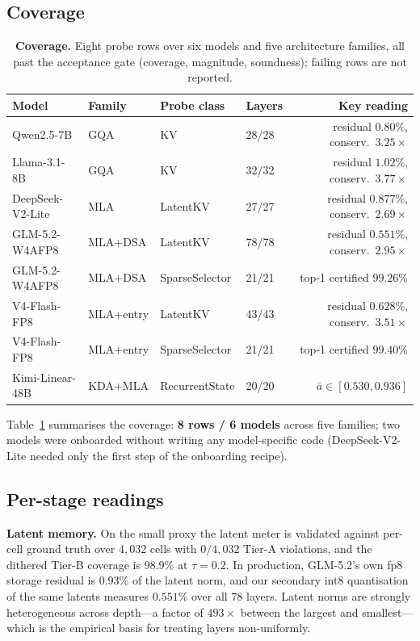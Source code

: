 \documentclass[11pt]{article}
\begin{document}
\subsection{Coverage}
\begin{table}[t]\centering\small
\begin{tabular}{llllr}
\toprule
Model & Family & Probe class & Layers & Key reading\\
\midrule
Qwen2.5-7B      & GQA & KV & 28/28 & residual $0.80\%$, conserv.\ $3.25\times$\\
Llama-3.1-8B    & GQA & KV & 32/32 & residual $1.02\%$, conserv.\ $3.77\times$\\
DeepSeek-V2-Lite& MLA & LatentKV & 27/27 & residual $0.877\%$, conserv.\ $2.69\times$\\
GLM-5.2-W4AFP8  & MLA+DSA & LatentKV & 78/78 & residual $0.551\%$, conserv.\ $2.95\times$\\
GLM-5.2-W4AFP8  & MLA+DSA & SparseSelector & 21/21 & top-1 certified $99.26\%$\\
V4-Flash-FP8    & MLA+entry & LatentKV & 43/43 & residual $0.628\%$, conserv.\ $3.51\times$\\
V4-Flash-FP8    & MLA+entry & SparseSelector & 21/21 & top-1 certified $99.40\%$\\
Kimi-Linear-48B & KDA+MLA & RecurrentState & 20/20 & $\bar a\in[0.530,0.936]$\\
\bottomrule
\end{tabular}
\caption{\textbf{Coverage.} Eight probe rows over six models and
five architecture families, all past the acceptance gate (coverage,
magnitude, soundness); failing rows are not reported.}
\label{tab:coverage}
\end{table}

Table~\ref{tab:coverage} summarises the coverage: \textbf{8 rows / 6 models}
across five families; two models were onboarded without writing any
model-specific code (DeepSeek-V2-Lite needed only the first step of the
onboarding recipe).

\subsection{Per-stage readings}
\textbf{Latent memory.} On the small proxy the latent meter is validated against
per-cell ground truth over $4{,}032$ cells with $0/4{,}032$ Tier-A violations, and
the dithered Tier-B coverage is $98.9\%$ at $\tau=0.2$. In production, GLM-5.2's own
fp8 storage residual is $0.93\%$ of the latent norm, and our secondary int8
quantisation of the same latents measures $0.551\%$ over all $78$ layers. Latent
norms are strongly heterogeneous across depth---a factor of $493\times$ between the
largest and smallest---which is the empirical basis for treating layers
non-uniformly.
\end{document}
